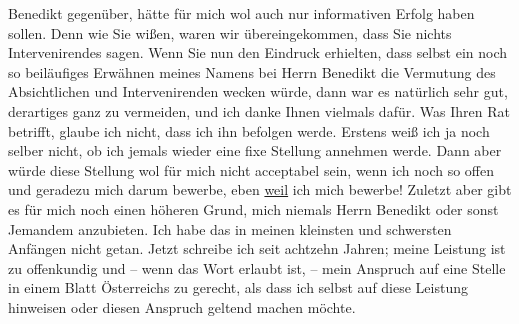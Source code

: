                   Benedikt gegenüber, hätte für mich wol auch
               nur informativen Erfolg haben sollen. Denn wie Sie wißen, waren wir übereingekommen,
               dass Sie nichts Intervenirendes sagen. Wenn Sie nun den Eindruck erhielten, dass
               selbst ein noch so beiläufiges Erwähnen meines Namens bei Herrn Benedikt die Vermutung des Absichtlichen und Intervenirenden
               wecken würde, dann war es natürlich sehr gut, derartiges ganz zu vermeiden, und ich
               danke Ihnen vielmals dafür. Was Ihren Rat betrifft, glaube ich nicht, dass ich ihn
               befolgen werde. Erstens weiß ich ja noch selber nicht, ob ich jemals wieder eine fixe
                  {\pb}Stellung annehmen werde.
               Dann aber würde diese Stellung wol für mich nicht acceptabel sein, wenn ich noch so
               offen und geradezu mich darum bewerbe, {\dotstwo} eben \uline{weil} ich mich bewerbe! Zuletzt aber gibt es für mich
               noch einen höheren Grund, mich \strikeout{\textcolor{gray}{×}\-\textcolor{gray}{×}\-\textcolor{gray}{×}\-\textcolor{gray}{×}\-\textcolor{gray}{×}\-\textcolor{gray}{×}\-\textcolor{gray}{×}\-\textcolor{gray}{×}\-\textcolor{gray}{×}\-\textcolor{gray}{×}\-\textcolor{gray}{×}\-\textcolor{gray}{×}\-\textcolor{gray}{×}\-\textcolor{gray}{×}\-\textcolor{gray}{×}\-\textcolor{gray}{×}\-\textcolor{gray}{×}\-\textcolor{gray}{×}\-\textcolor{gray}{×}\-\textcolor{gray}{×}} niemals Herrn Benedikt oder sonst
               Jemandem anzubieten. Ich habe das in meinen kleinsten und schwersten Anfängen nicht
               getan. Jetzt schreibe ich seit achtzehn Jahren; meine Leistung ist zu offenkundig und
               – wenn das Wort erlaubt ist, – mein Anspruch auf eine Stelle in einem Blatt Österreichs zu gerecht, als dass ich selbst auf
               diese Leistung hinweisen oder diesen Anspruch geltend machen möchte.\pend
           
